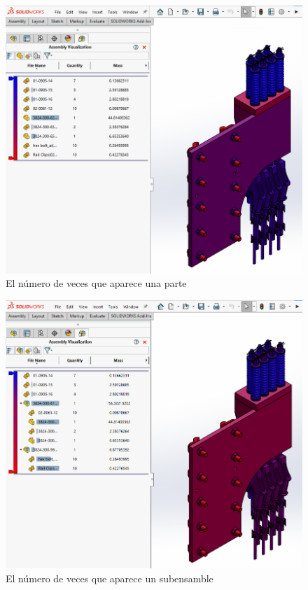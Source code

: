 \documentclass{report}
\begin{document}
\begin{figure}[H]
	\centering
	\includegraphics[width=0.95\linewidth, height=0.5\textheight,keepaspectratio]{Imagenes/solidworks_assemblyvisualization02}
	\caption{El número de veces que aparece una parte}
	\label{fig:solidworksassemblyvisualization02}
\end{figure}

\begin{figure}[H]
	\centering
	\includegraphics[width=0.95\linewidth, height=0.5\textheight,keepaspectratio]{Imagenes/solidworks_assemblyvisualization03}
	\caption{El número de veces que aparece un subensamble}
	\label{fig:solidworksassemblyvisualization03}
\end{figure}
\end{document}
